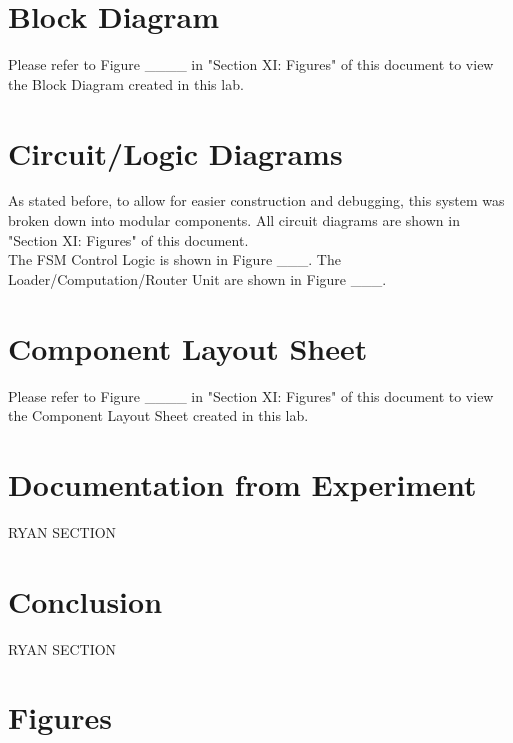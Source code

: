 \documentclass[journal, twocolumn, final,11pt,letterpaper]{IEEEtran}
\begin{document}
\section{Block Diagram} 
Please refer to Figure \_\_\_\_ in "Section XI: Figures" of this document to view the Block Diagram created in this lab.
 
\section{Circuit/Logic Diagrams}
As stated before, to allow for easier  construction and debugging, this system was broken down into modular components. All circuit diagrams are shown in "Section XI: Figures" of this document.\\
 
The FSM Control Logic is shown in Figure \_\_\_. The Loader/Computation/Router Unit are shown in Figure \_\_\_.
 
\section{Component Layout Sheet}
Please refer to Figure \_\_\_\_ in "Section XI: Figures" of this document to view the Component Layout Sheet created in this lab.

\section{Documentation from Experiment}
RYAN SECTION


\section{Conclusion}
RYAN SECTION

\newpage
\onecolumn
\section{Figures}


\end{document}
